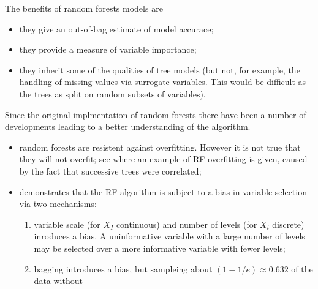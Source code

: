 \documentclass[10pt,a4paper]{article}  %
\begin{document}



The benefits of random forests models are
  \begin{itemize}
  \item they give an out-of-bag estimate of model accurace;
  \item they provide a measure of variable importance;
  \item they inherit some of the qualities of tree models (but not, for example, the handling of missing values via surrogate
    variables. This would be difficult as the trees as split on random subsets of variables).
  \end{itemize}


Since the original implmentation of random forests there have been a number of developments leading to a better understanding of
the algorithm. 
\begin{itemize}
\item random forests are resistent against overfitting. However it is not true that they will not overfit; see \cite{Segal.2004}
  where an example of RF overfitting is  given, caused by the fact that successive trees were correlated;
\item \cite{Strobl.et.al.2007} demonstrates that the RF algorithm is subject to a bias in variable selection via two mechanisms:
  \begin{enumerate}
  \item variable scale (for $X_I$ continuous) and number of levels (for $X_i$ discrete) inroduces a bias. A uninformative  variable with a large
    number of levels may be selected over a more informative  variable with fewer levels;
  \item bagging introduces a bias, but sampleing about $(1- 1/e) \approx 0.632$  of the data without 
  \end{enumerate}
\end{itemize} 
\end{document}
